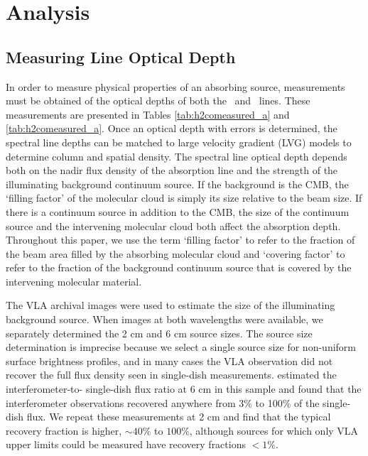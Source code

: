 \section{Analysis}
\label{sec:analysis}

%
%
%

\subsection{Measuring Line Optical Depth}
\label{sec:linedepth}
In order to measure physical properties of an absorbing source, measurements
must be obtained of the optical depths of both the \oneone\ and \twotwo\ lines.
These measurements are presented in Tables \ref{tab:h2comeasured_a} and \ref{tab:h2comeasured_a}.
Once an optical depth with errors is determined, the spectral line depths can be matched
to large velocity gradient (LVG) models to determine column and spatial
density.  The spectral line optical depth depends both on the nadir flux density of the
absorption line and the strength of the illuminating background continuum
source.  If the background is the CMB, the `filling factor' of the molecular
cloud is simply its size relative to the beam size.  If there is a continuum
source in addition to the CMB, the size of the continuum source and the
intervening molecular cloud both affect the absorption depth.  Throughout this
paper, we use the term `filling factor' to refer to the fraction of the beam area filled
by the absorbing molecular cloud and `covering factor' to refer to the fraction
of the background continuum source that is covered by the intervening molecular
material.

The VLA archival images were used to estimate the size of the illuminating
background source.  When images at both wavelengths were available, we
separately determined the 2 cm and 6 cm source sizes.  The source size
determination is imprecise because we select a single source size for
non-uniform surface brightness profiles, and in many cases the VLA observation
did not recover the full flux density seen in single-dish measurements.
\citet{Araya2002} estimated the interferometer-to- single-dish flux ratio at
6 cm in this sample and found that the interferometer observations recovered
anywhere from 3\% to 100\% of the single-dish flux.  We repeat these
measurements at 2 cm and find that the typical recovery fraction is higher,
$\sim40\%$ to $100\%$, although sources for which only VLA upper limits could
be measured have recovery fractions $<1\%$. 

